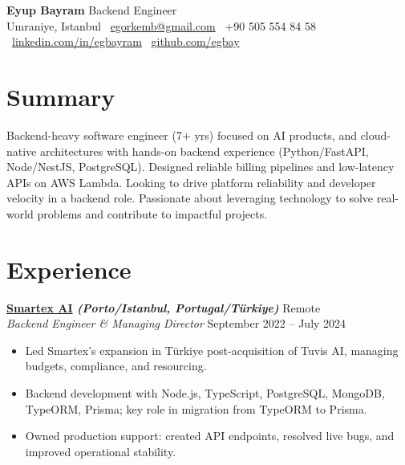 \documentclass[10pt,a4paper]{extarticle}
\begin{document}
\begin{center}
  \begin{minipage}{\textwidth}
    \centering
    {\LARGE\textbf{Eyup Bayram}} \hspace{2pt} {\LARGE Backend Engineer}\\[8pt]
    Umraniye, Istanbul \textbullet\ 
    \href{mailto:egorkemb@gmail.com}{egorkemb@gmail.com} \textbullet\
    +90 505 554 84 58 \textbullet\
    \href{https://linkedin.com/in/egbayram}{linkedin.com/in/egbayram} \textbullet\
    \href{https://github.com/egbay}{github.com/egbay}
  \end{minipage}
\end{center}

\section{Summary}
Backend-heavy software engineer (7+ yrs) focused on AI products, and cloud-native architectures with hands-on backend experience (Python/FastAPI, Node/NestJS, PostgreSQL). Designed reliable billing pipelines and low-latency APIs on AWS Lambda. Looking to drive platform reliability and developer velocity in a backend role. Passionate about leveraging technology to solve real-world problems and contribute to impactful projects. 

\section{Experience}


\textbf{\href{https://smartex.ai}{Smartex AI} \textit{(Porto/Istanbul, Portugal/Türkiye)}} \hfill Remote\\
\textit{Backend Engineer \& Managing Director} \hfill September 2022 --  July 2024
\begin{itemize}[leftmargin=*,noitemsep,topsep=0pt]
    \item Led Smartex’s expansion in Türkiye post-acquisition of Tuvis AI, managing budgets, compliance, and resourcing.
    \item Backend development with Node.js, TypeScript, PostgreSQL, MongoDB, TypeORM, Prisma; key role in migration from TypeORM to Prisma.
    \item Owned production support: created API endpoints, resolved live bugs, and improved operational stability.
\end{itemize}
\end{document}
